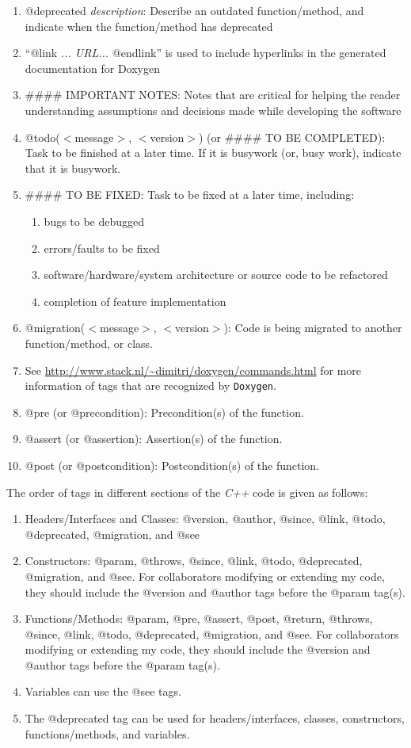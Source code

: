 \documentclass[letter,12pt]{article}
\begin{document}
\begin{enumerate}
\item @deprecated {\it description}: Describe an outdated function/method, and indicate when the function/method has deprecated
\item ``@link {\it ... URL...} @endlink'' is used to include hyperlinks in the generated documentation for Doxygen
\item \#\#\#\# IMPORTANT NOTES: Notes that are critical for helping the reader understanding assumptions and decisions made while developing the software
\item @todo($<$message$>$, $<$version$>$) (or \#\#\#\# TO BE COMPLETED): Task to be finished at a later time. If it is busywork (or, busy work), indicate that it is busywork.
\item \#\#\#\# TO BE FIXED: Task to be fixed at a later time, including: \vspace{-0.3cm}
	\begin{enumerate} \itemsep -2pt
	\item bugs to be debugged
	\item errors/faults to be fixed
	\item software/hardware/system architecture or source code to be refactored
	\item completion of feature implementation
	\end{enumerate}
\item @migration($<$message$>$, $<$version$>$): Code is being migrated to another function/method, or class.
\item See \url{http://www.stack.nl/~dimitri/doxygen/commands.html} for more information of tags that are recognized by {\tt Doxygen}.
\item @pre (or @precondition): Precondition(s) of the function.
\item @assert (or @assertion): Assertion(s) of the function.
\item @post (or @postcondition): Postcondition(s) of the function.
\end{enumerate}

The order of tags in different sections of the {\it C++} code is given as follows: \vspace{-0.3cm}
\begin{enumerate} \itemsep -4pt
\item Headers/Interfaces and Classes: @version, @author, @since, @link, @todo, @deprecated, @migration, and @see
\item Constructors: @param, @throws, @since, @link, @todo, @deprecated, @migration, and @see. For collaborators modifying or extending my code, they should include the @version and @author tags before the @param tag(s).
\item Functions/Methods: @param, @pre, @assert, @post, @return, @throws, @since, @link, @todo, @deprecated, @migration, and @see. For collaborators modifying or extending my code, they should include the @version and @author tags before the @param tag(s).
\item Variables can use the @see tags.
\item The @deprecated tag can be used for headers/interfaces, classes, constructors, functions/methods, and variables.
\end{enumerate}
\end{document}
